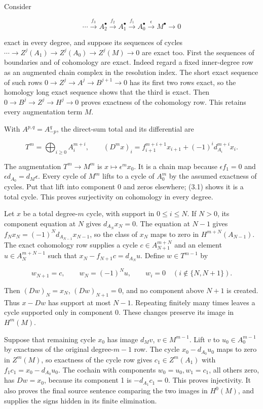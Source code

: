 \documentclass[11pt]{article}
\begin{document}
Consider

\[
\cdots\xrightarrow{f_3}A_2^\bullet\xrightarrow{f_2}A_1^\bullet
\xrightarrow{f_1}A_0^\bullet\xrightarrow{\epsilon}M^\bullet\to0
\]

exact in every degree, and suppose its sequences of cycles \(\cdots\to Z^j(A_1)\to Z^j(A_0)\to Z^j(M)\to0\) are exact too. First the sequences of boundaries and of cohomology are exact. Indeed regard a fixed inner-degree row as an augmented chain complex in the resolution index. The short exact sequence of such rows \(0\to Z^j\to A^j\to B^{j+1}\to0\) has its first two rows exact, so the homology long exact sequence shows that the third is exact. Then \(0\to B^j\to Z^j\to H^j\to0\) proves exactness of the cohomology row. This retains every augmentation term \(M\).

With \(A^{p,q}=A_{-p}^q\), the direct-sum total and its differential are

\[
T^m=\bigoplus_{i\geq0}A_i^{m+i},\qquad
(D^mx)_i=f_{i+1}^{m+i+1}x_{i+1}+(-1)^i d_{A_i}^{m+i}x_i.       \tag{3.1}
\]

The augmentation \(T^m\to M^m\) is \(x\mapsto\epsilon^m x_0\). It is a chain map because \(\epsilon f_1=0\) and \(\epsilon d_{A_0}=d_M\epsilon\). Every cycle of \(M^m\) lifts to a cycle of \(A_0^m\) by the assumed exactness of cycles. Put that lift into component 0 and zeros elsewhere; (3.1) shows it is a total cycle. This proves surjectivity on cohomology in every degree.

Let \(x\) be a total degree-\(m\) cycle, with support in \(0\leq i\leq N\). If \(N>0\), its component equation at \(N\) gives \(d_{A_N}x_N=0\). The equation at \(N-1\) gives \(f_Nx_N=(-1)^N d_{A_{N-1}}x_{N-1}\), so the class of \(x_N\) maps to zero in \(H^{m+N}(A_{N-1})\). The exact cohomology row supplies a cycle \(c\in A_{N+1}^{m+N}\) and an element \(u\in A_N^{m+N-1}\) such that \(x_N-f_{N+1}c=d_{A_N}u\). Define \(w\in T^{m-1}\) by

\[
w_{N+1}=c,\qquad w_N=(-1)^N u,
\qquad w_i=0\quad(i\notin\{N,N+1\}).
\]

Then \((Dw)_N=x_N\), \((Dw)_{N+1}=0\), and no component above \(N+1\) is created. Thus \(x-Dw\) has support at most \(N-1\). Repeating finitely many times leaves a cycle supported only in component 0. These changes preserve its image in \(H^m(M)\).

Suppose that remaining cycle \(x_0\) has image \(d_Mv\), \(v\in M^{m-1}\). Lift \(v\) to \(u_0\in A_0^{m-1}\) by exactness of the original degree-\(m-1\) row. The cycle \(x_0-d_{A_0}u_0\) maps to zero in \(Z^m(M)\), so exactness of the cycle row gives \(c_1\in Z^m(A_1)\) with \(f_1c_1=x_0-d_{A_0}u_0\). The cochain with components \(w_0=u_0,w_1=c_1\), all others zero, has \(Dw=x_0\), because its component 1 is \(-d_{A_1}c_1=0\). This proves injectivity. It also proves the final source sentence comparing the two images in \(H^0(M)\), and supplies the signs hidden in its finite elimination.
\end{document}
